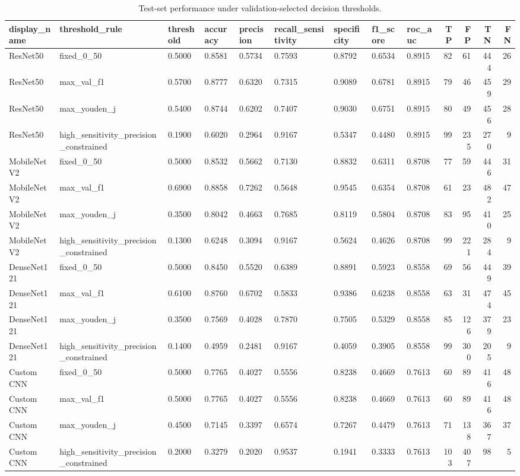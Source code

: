 \begin{table}
\caption{Test-set performance under validation-selected decision thresholds.}
\label{tab:threshold_tuning}
\begin{tabular}{lllllllllrrrr}
\toprule
display\_name & threshold\_rule & threshold & accuracy & precision & recall\_sensitivity & specificity & f1\_score & roc\_auc & TP & FP & TN & FN \\
\midrule
ResNet50 & fixed\_0\_50 & 0.5000 & 0.8581 & 0.5734 & 0.7593 & 0.8792 & 0.6534 & 0.8915 & 82 & 61 & 444 & 26 \\
ResNet50 & max\_val\_f1 & 0.5700 & 0.8777 & 0.6320 & 0.7315 & 0.9089 & 0.6781 & 0.8915 & 79 & 46 & 459 & 29 \\
ResNet50 & max\_youden\_j & 0.5400 & 0.8744 & 0.6202 & 0.7407 & 0.9030 & 0.6751 & 0.8915 & 80 & 49 & 456 & 28 \\
ResNet50 & high\_sensitivity\_precision\_constrained & 0.1900 & 0.6020 & 0.2964 & 0.9167 & 0.5347 & 0.4480 & 0.8915 & 99 & 235 & 270 & 9 \\
MobileNetV2 & fixed\_0\_50 & 0.5000 & 0.8532 & 0.5662 & 0.7130 & 0.8832 & 0.6311 & 0.8708 & 77 & 59 & 446 & 31 \\
MobileNetV2 & max\_val\_f1 & 0.6900 & 0.8858 & 0.7262 & 0.5648 & 0.9545 & 0.6354 & 0.8708 & 61 & 23 & 482 & 47 \\
MobileNetV2 & max\_youden\_j & 0.3500 & 0.8042 & 0.4663 & 0.7685 & 0.8119 & 0.5804 & 0.8708 & 83 & 95 & 410 & 25 \\
MobileNetV2 & high\_sensitivity\_precision\_constrained & 0.1300 & 0.6248 & 0.3094 & 0.9167 & 0.5624 & 0.4626 & 0.8708 & 99 & 221 & 284 & 9 \\
DenseNet121 & fixed\_0\_50 & 0.5000 & 0.8450 & 0.5520 & 0.6389 & 0.8891 & 0.5923 & 0.8558 & 69 & 56 & 449 & 39 \\
DenseNet121 & max\_val\_f1 & 0.6100 & 0.8760 & 0.6702 & 0.5833 & 0.9386 & 0.6238 & 0.8558 & 63 & 31 & 474 & 45 \\
DenseNet121 & max\_youden\_j & 0.3500 & 0.7569 & 0.4028 & 0.7870 & 0.7505 & 0.5329 & 0.8558 & 85 & 126 & 379 & 23 \\
DenseNet121 & high\_sensitivity\_precision\_constrained & 0.1400 & 0.4959 & 0.2481 & 0.9167 & 0.4059 & 0.3905 & 0.8558 & 99 & 300 & 205 & 9 \\
Custom CNN & fixed\_0\_50 & 0.5000 & 0.7765 & 0.4027 & 0.5556 & 0.8238 & 0.4669 & 0.7613 & 60 & 89 & 416 & 48 \\
Custom CNN & max\_val\_f1 & 0.5000 & 0.7765 & 0.4027 & 0.5556 & 0.8238 & 0.4669 & 0.7613 & 60 & 89 & 416 & 48 \\
Custom CNN & max\_youden\_j & 0.4500 & 0.7145 & 0.3397 & 0.6574 & 0.7267 & 0.4479 & 0.7613 & 71 & 138 & 367 & 37 \\
Custom CNN & high\_sensitivity\_precision\_constrained & 0.2000 & 0.3279 & 0.2020 & 0.9537 & 0.1941 & 0.3333 & 0.7613 & 103 & 407 & 98 & 5 \\
\bottomrule
\end{tabular}
\end{table}

